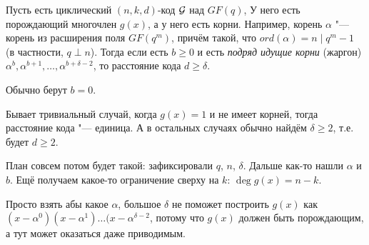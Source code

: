 \begin{theorem}
	Пусть есть циклический $(n, k, d)$-код $\cal G$ над $GF(q)$,
	У него есть порождающий многочлен $g(x)$, а у него есть корни.
	Например, корень $\alpha$ "--- корень из расширения поля $GF(q^m)$,
	причём такой, что $ord (\alpha) = n \mid q^m-1$ (в частности, $q \perp n$).
	Тогда если есть $b \ge 0$ и есть \textit{подряд идущие корни} (жаргон)
	$\alpha^b, \alpha^{b+1}, \dots, \alpha^{b+\delta-2}$,
	то расстояние кода $d \ge \delta$.
\end{theorem}
\begin{Rem}
	Обычно берут $b=0$.
\end{Rem}
\begin{Rem}
	Бывает тривиальный случай, когда $g(x)=1$ и не имеет корней,
	тогда расстояние кода "--- единица.
	А в остальных случаях обычно найдём $\delta \ge 2$,
	т.е. будет $d \ge 2$.
\end{Rem}
\begin{Rem}
	План совсем потом будет такой: зафиксировали $q$, $n$, $\delta$.
	Дальше как-то нашли $\alpha$ и $b$.
	Ещё получаем какое-то ограничение сверху на $k$: $\deg g(x)=n-k$.
\end{Rem}
\begin{Rem}
	Просто взять абы какое $\alpha$, большое $\delta$ не поможет построить $g(x)$
	как $(x-\alpha^0)(x-\alpha^1)\dots(x-\alpha^{\delta-2}$, потому что
	$g(x)$ должен быть порождающим, а тут может оказаться даже приводимым.
\end{Rem}
